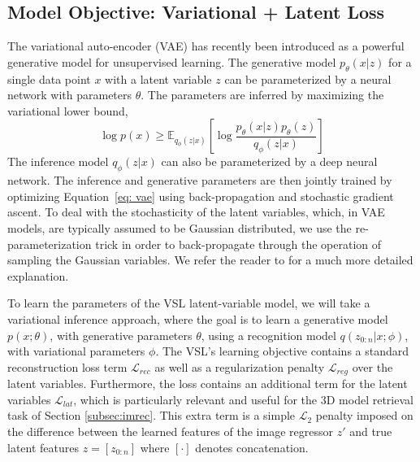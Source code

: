 \documentclass[10pt,twocolumn,letterpaper]{article}
\begin{document}
\subsection{Model Objective: Variational + Latent Loss}
The variational auto-encoder (VAE) \cite{kingma2013auto} has recently been introduced as a powerful generative model for unsupervised learning. The  generative model $p_\theta(x|z)$ for a single data point $x$ with a latent variable $z$ can be parameterized by a neural network with parameters $\theta$. The parameters are inferred by maximizing the variational lower bound,
\begin{equation}
\label{eq: vae}
    \log p(x) \geq \mathbb{E}_{{q}_\phi(z|x)}\left[\log \frac{p_\theta(x|z)p_\theta(z)}{q_\phi(z|x)} \right]
\end{equation}
The inference model $q_\phi(z|x)$ can also be parameterized by a deep neural network. The inference and generative parameters are then jointly trained by optimizing Equation\ \ref{eq: vae} using back-propagation and stochastic gradient ascent. To deal with the stochasticity of the latent variables, which, in VAE models, are typically assumed to be Gaussian distributed, we use the re-parameterization trick in order to back-propagate through the operation of sampling the Gaussian variables. We refer the reader to \cite{doersch2016tutorial} for a much more detailed explanation.

To learn the parameters of the VSL latent-variable model, we will take a variational inference approach, where the goal is to learn a  generative model $p(x;\theta)$, with generative parameters $\theta$, using a recognition model $q(z_{0:n}|x;\phi)$, with variational parameters $\phi$. The VSL's learning objective contains a standard reconstruction loss term $\mathcal{L}_{rec}$ as well as a regularization penalty $\mathcal{L}_{reg}$ over the latent variables. Furthermore, the loss contains an additional term for the latent variables $\mathcal{L}_{lat}$, which is particularly relevant and useful for the 3D model retrieval task of Section \ref{subsec:imrec}. This extra term is a simple $\mathcal{L}_2$ penalty imposed on the difference between the learned features of the image regressor $z'$ and true latent features $z=[z_{0:n}]$ where $[\cdot]$ denotes concatenation.
\end{document}
